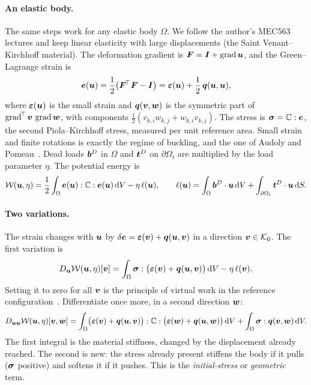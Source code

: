 \paragraph{An elastic body.}
%
The same steps work for any elastic body $\Omega$. We follow the author's MEC563
lectures and keep linear elasticity with large displacements (the Saint
Venant--Kirchhoff material). The deformation gradient is
$\bm{F} = \bm{I} + \operatorname{grad}\bm{u}$, and the Green--Lagrange strain is
\begin{equation}\label{eq:nc-green}
  \bm{e}(\bm{u}) = \frac12\bigl(\bm{F}^{\!\top}\bm{F} - \bm{I}\bigr)
  = \bm{\varepsilon}(\bm{u}) + \frac12\,\bm{q}(\bm{u},\bm{u}),
\end{equation}
where $\bm{\varepsilon}(\bm{u})$ is the small strain and $\bm{q}(\bm{v},\bm{w})$ is the symmetric part of
$\operatorname{grad}^{\!\top}\bm{v}\,\operatorname{grad}\bm{w}$, with components
$\tfrac12(v_{k,i}w_{k,j} + w_{k,i}v_{k,j})$. The stress is $\bm{\sigma} = \mathbb{C}:\bm{e}$, the second
Piola--Kirchhoff stress, measured per unit reference area. Small strain and finite rotations is
exactly the regime of buckling, and the one of Audoly and Pomeau~\cite[Section~2.5]{nc-audoly2010}. Dead loads
$\bm{b}^D$ in $\Omega$ and $\bm{t}^D$ on $\partial\Omega_t$ are multiplied by the load parameter
$\eta$. The potential energy is
\begin{equation}\label{eq:nc-energy}
  \mathcal{W}(\bm{u},\eta) = \frac12\int_\Omega \bm{e}(\bm{u}):\mathbb{C}:\bm{e}(\bm{u})\,\mathrm{d} V
  - \eta\,\ell(\bm{u}),
  \qquad
  \ell(\bm{u}) = \int_\Omega \bm{b}^D\cdot\bm{u}\,\mathrm{d} V + \int_{\partial\Omega_t}\bm{t}^D\cdot\bm{u}\,\mathrm{d} S .
\end{equation}

\paragraph{Two variations.}
The strain changes with $\bm{u}$ by $\delta\bm{e} = \bm{\varepsilon}(\bm{v}) + \bm{q}(\bm{u},\bm{v})$ in a direction
$\bm{v} \in \mathcal{K}_0$. The first variation is
\begin{equation}\label{eq:nc-first}
  D_{\bm{u}}\mathcal{W}(\bm{u},\eta)[\bm{v}] = \int_\Omega \bm{\sigma} : \bigl(\bm{\varepsilon}(\bm{v}) + \bm{q}(\bm{u},\bm{v})\bigr)\,\mathrm{d} V
  - \eta\,\ell(\bm{v}) .
\end{equation}
Setting it to zero for all $\bm{v}$ is the principle of virtual work in the reference
configuration~\cite[Section~7.2]{nc-constantinescu2007}. Differentiate once more, in a
second direction $\bm{w}$:
\begin{equation}\label{eq:nc-second}
  D_{\bm{u}\bm{u}}\mathcal{W}(\bm{u},\eta)[\bm{v},\bm{w}] =
  \int_\Omega \bigl(\bm{\varepsilon}(\bm{v}) + \bm{q}(\bm{u},\bm{v})\bigr):\mathbb{C}:\bigl(\bm{\varepsilon}(\bm{w}) + \bm{q}(\bm{u},\bm{w})\bigr)\,\mathrm{d} V
  + \int_\Omega \bm{\sigma} : \bm{q}(\bm{v},\bm{w})\,\mathrm{d} V .
\end{equation}
The first integral is the material stiffness, changed by the displacement already
reached. The second is new: the stress already present stiffens the body if it pulls
($\bm{\sigma}$ positive) and softens it if it pushes. This is the \emph{initial-stress} or
\emph{geometric} term.
%


